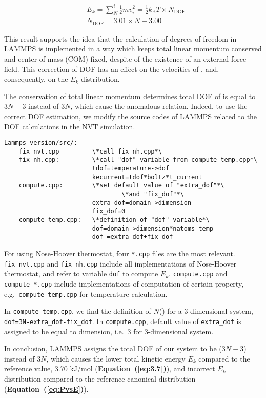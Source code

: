 \documentclass{article}
\newcommand{\refeq}[1]{\textbf{Equation~(\ref{#1})}}
\begin{document}
\begin{align}
    \label{eq:dof_thm}
    &E_k=\sum^i_N \frac{1}{2}mv^2_i
    =\frac{1}{2} k_\text{B} T \times N_\text{DOF}\\
    \label{eq:dof_value}
    &N_\text{DOF}
    =3.01\times N-3.00
\end{align}

This result supports the idea that the calculation of degrees of freedom in LAMMPS is implemented in a way which keeps total linear momentum conserved and center of mass (COM) fixed,
despite of the existence of an external force field.
This correction of DOF has an effect on the velocities of , and, consequently, on the $E_k$ distribution.

The conservation of total linear momentum determines total DOF of  is equal to $3N-3$ instead of $3N$, which cause the anomalous relation.
Indeed, to use the correct DOF estimation, we modify the source codes of LAMMPS related to the DOF calculations in the NVT simulation.

\begin{verbatim}
Lammps-version/src/:
    fix_nvt.cpp         \*call fix_nh.cpp*\
    fix_nh.cpp:         \*call "dof" variable from compute_temp.cpp*\
                        tdof=temperature->dof
                        kecurrent=tdof*boltz*t_current
    compute.cpp:        \*set default value of "extra_dof"*\
                                \*and "fix_dof"*\
                        extra_dof=domain->dimension
                        fix_dof=0
    compute_temp.cpp:   \*definition of "dof" variable*\
                        dof=domain->dimension*natoms_temp
                        dof-=extra_dof+fix_dof
\end{verbatim}

For using Nose-Hoover thermostat, four \texttt{*.cpp} files are the most relevant.
\texttt{fix\_nvt.cpp} and \texttt{fix\_nh.cpp} include all implementations of Nose-Hoover thermostat, and refer to variable \texttt{dof} to compute $E_k$.
\texttt{compute.cpp} and \texttt{compute\_*.cpp} include implementations of computation of certain property, e.g.\ \texttt{compute\_temp.cpp} for temperature calculation.

In \texttt{compute\_temp.cpp}, we find the definition of $N$() for a 3-dimensional system,
\texttt{dof=3N-extra\_dof-fix\_dof}.
In \texttt{compute.cpp}, default value of \texttt{extra\_dof} is assigned to be equal to dimension, i.e.\ 3 for 3-dimensional system.

In conclusion, LAMMPS assigns the total DOF of our system to be ($3N-3$) instead of $3N$, which causes the lower total kinetic energy $E_k$ compared to the reference value, 3.70 kJ/mol (\refeq{eq:3.7}), and incorrect $E_k$ distribution compared to the reference canonical distribution (\refeq{eq:PvsE}).
\end{document}

